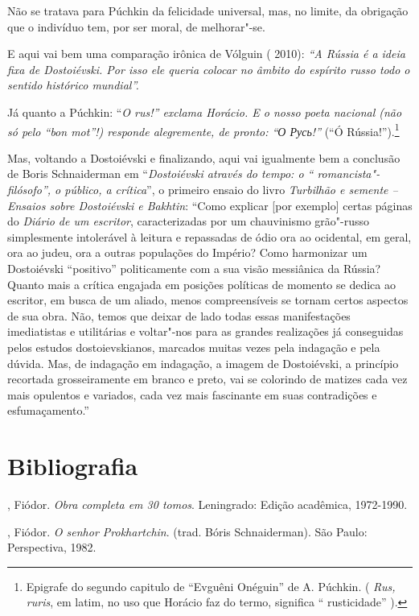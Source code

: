 Não se tratava para Púchkin da felicidade universal, mas, no limite, da
obrigação que o indivíduo tem, por ser moral, de melhorar"-se.

E aqui vai bem uma comparação irônica de Vólguin ( 2010): \emph{``A
Rússia é a ideia fixa de Dostoiévski. Por isso ele queria colocar no
âmbito do espírito russo todo o sentido histórico mundial''.}

Já quanto a Púchkin: ``\emph{O rus!'' exclama Horácio. E o nosso poeta
nacional (não só pelo ``bon mot''!) responde alegremente, de pronto: ``О
Русь!''} (``Ó Rússia!'').\footnote{Epigrafe do segundo capitulo de
  ``Evguêni Onéguin'' de A. Púchkin. ( \emph{Rus, ruris}, em latim, no
  uso que Horácio faz do termo, significa `` rusticidade'' ).}

Mas, voltando a Dostoiévski e finalizando, aqui vai igualmente bem a
conclusão de Boris Schnaiderman em ``\emph{Dostoiévski através do tempo:
o `` romancista"-filósofo'', o público, a crítica}'', o primeiro ensaio
do livro \emph{Turbilhão e semente -- Ensaios sobre Dostoiévski e
Bakhtin}: ``Como explicar {[}por exemplo{]} certas páginas do
\emph{Diário de um escritor}, caracterizadas por um chauvinismo
grão"-russo simplesmente intolerável à leitura e repassadas de ódio ora
ao ocidental, em geral, ora ao judeu, ora a outras populações do
Império? Como harmonizar um Dostoiévski ``positivo'' politicamente com a
sua visão messiânica da Rússia? Quanto mais a crítica engajada em
posições políticas de momento se dedica ao escritor, em busca de um
aliado, menos compreensíveis se tornam certos aspectos de sua obra. Não,
temos que deixar de lado todas essas manifestações imediatistas e
utilitárias e voltar"-nos para as grandes realizações já conseguidas
pelos estudos dostoievskianos, marcados muitas vezes pela indagação e
pela dúvida. Mas, de indagação em indagação, a imagem de Dostoiévski, a
princípio recortada grosseiramente em branco e preto, vai se colorindo
de matizes cada vez mais opulentos e variados, cada vez mais fascinante
em suas contradições e esfumaçamento.''

\section{Bibliografia}

, Fiódor. \emph{Obra completa em 30 tomos}. Leningrado:
Edição acadêmica, 1972-1990.

, Fiódor. \emph{O senhor Prokhartchin}. (trad. Bóris
Schnaiderman). São Paulo: Perspectiva, 1982.

